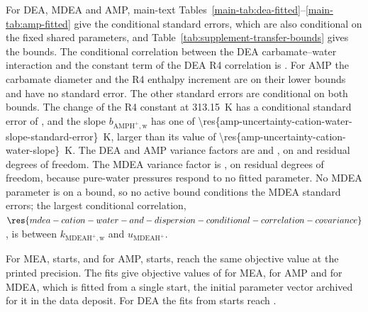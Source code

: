 \documentclass[a4paper,11pt]{article}
\begin{document}
For DEA, MDEA and AMP, main-text Tables~\ref{main-tab:dea-fitted}--\ref{main-tab:amp-fitted} give the conditional standard errors, which are also conditional on the fixed shared parameters, and Table~\ref{tab:supplement-transfer-bounds} gives the bounds.
The conditional correlation between the DEA carbamate--water interaction and the constant term of the DEA R4 correlation is .
For AMP the carbamate diameter and the R4 enthalpy increment are on their lower bounds and have no standard error.
The other standard errors are conditional on both bounds.
The change of the R4 constant at \SI{313.15}{\kelvin} has a conditional standard error of , and the slope $b_{\mathrm{AMPH^+,w}}$ has one of \SI{\res{amp-uncertainty-cation-water-slope-standard-error}}{\kelvin}, larger than its value of \SI{\res{amp-uncertainty-cation-water-slope}}{\kelvin}.
The DEA and AMP variance factors are  and , on  and  residual degrees of freedom.
The MDEA variance factor is , on  residual degrees of freedom, because  pure-water pressures respond to no fitted parameter.
No MDEA parameter is on a bound, so no active bound conditions the MDEA standard errors; the largest conditional correlation, $\res{mdea-cation-water-and-dispersion-conditional-correlation-covariance}$, is between $k_{\mathrm{MDEAH^+,w}}$ and $u_{\mathrm{MDEAH^+}}$.



For MEA,  starts, and for AMP,  starts, reach the same objective value at the printed precision.
The fits give objective values of  for MEA,  for AMP and  for MDEA, which is fitted from a single start, the initial parameter vector archived for it in the data deposit.
For DEA the fits from  starts reach .
\end{document}
